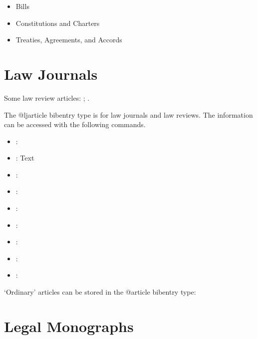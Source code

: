\begin{itemize}
\item Bills
\item Constitutions and Charters
\item Treaties, Agreements, and Accords
\end{itemize}


\section{Law Journals}

\p Some law review articles: ; .

\p The @ljarticle bibentry type is for law journals and law reviews.
\p The information can be accessed with the following commands.
\begin{itemize}
\item{}: 

\item{}: Text

\item{}: 

\item{}: 

\item{}: 

\item{}: 

\item{}: 

\item{}: 

\item{}: 

\end{itemize}

\p `Ordinary' articles can be stored in the @article bibentry type: \begin{quotation}\noindent{}\end{quotation}

\section{Legal Monographs}

